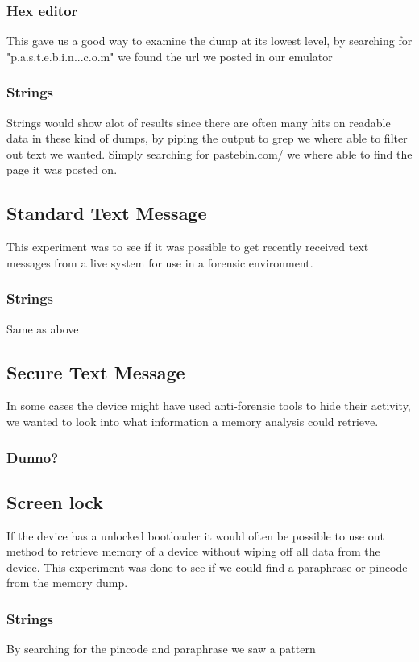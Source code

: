   \subsubsection{Hex editor}
  This gave us a good way to examine the dump at its lowest level, by searching for 
  "p.a.s.t.e.b.i.n...c.o.m" we found the url we posted in our emulator

  \subsubsection{Strings}
  Strings would show alot of results since there are often many hits on readable 
  data in these kind of dumps, by piping the output to grep we where able to 
  filter out text we wanted. Simply searching for pastebin.com/ we where able to 
  find the page it was posted on. 

\subsection{Standard Text Message}
This experiment was to see if it was possible to get recently received text 
messages from a live system for use in a forensic environment.

  \subsubsection{Strings}
  Same as above %

\subsection{Secure Text Message}
In some cases the device might have used anti-forensic tools to hide their 
activity, we wanted to look into what information a memory analysis could 
retrieve.

\subsubsection{Dunno?}

\subsection{Screen lock}
If the device has a unlocked bootloader it would often be possible to use out 
method to retrieve memory of a device without wiping off all data from the 
device. This experiment was done to see if we could find a paraphrase or 
pincode from the memory dump.

  \subsubsection{Strings}
  By searching for the pincode and paraphrase we saw a pattern 

